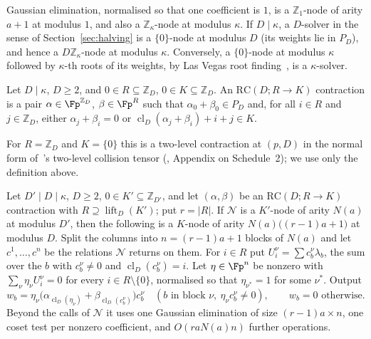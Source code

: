 Gaussian elimination, normalised so that one coefficient is $1$, is a $\mathbb{Z}_1$-node of arity $a+1$ at modulus $1$, and also a $\mathbb{Z}_\kappa$-node at modulus $\kappa$. If $D \mid \kappa$, a $D$-solver in the sense of Section~\ref{sec:halving} is a $\{0\}$-node at modulus $D$ (its weights lie in $P_D$), and hence a $D\mathbb{Z}_\kappa$-node at modulus $\kappa$. Conversely, a $\{0\}$-node at modulus $\kappa$ followed by $\kappa$-th roots of its weights, by Las Vegas root finding~\cite{Rabin1980}, is a $\kappa$-solver.

\begin{definition}
\label{def:rc}
Let $D \mid \kappa$, $D \ge 2$, and $0 \in R \subseteq \mathbb{Z}_D$, $0 \in K \subseteq \mathbb{Z}_D$. An $\mathrm{RC}(D;R\to K)$ contraction is a pair $\alpha \in \Fp^{\mathbb{Z}_D}$, $\beta \in \Fp^R$ such that $\alpha_0+\beta_0 \in P_D$ and, for all $i \in R$ and $j \in \mathbb{Z}_D$, either $\alpha_j+\beta_i = 0$ or $\operatorname{cl}_D(\alpha_j+\beta_i) + i + j \in K$.
\end{definition}

For $R = \mathbb{Z}_D$ and $K = \{0\}$ this is a two-level contraction at $(p,D)$ in the normal form of~\cite{IvanyosSantha2015}'s two-level collision tensor (\fullv, Appendix on Schedule~2); we use only the definition above.

\begin{lemma}
\label{lem:refine}
Let $D' \mid D \mid \kappa$, $D \ge 2$, $0 \in K' \subseteq \mathbb{Z}_{D'}$, and let $(\alpha,\beta)$ be an $\mathrm{RC}(D;R\to K)$ contraction with $R \supseteq \operatorname{lift}_D(K')$; put $r = |R|$. If $\mathcal N$ is a $K'$-node of arity $N(a)$ at modulus $D'$, then the following is a $K$-node of arity $N(a)\bigl((r-1)a+1\bigr)$ at modulus $D$. Split the columns into $n = (r-1)a+1$ blocks of $N(a)$ and let $c^1,\dots,c^n$ be the relations $\mathcal N$ returns on them. For $i \in R$ put $U^\nu_i = \sum c^\nu_b\lambda_b$, the sum over the $b$ with $c^\nu_b \ne 0$ and $\operatorname{cl}_D(c^\nu_b) = i$. Let $\eta \in \Fp^n$ be nonzero with $\sum_\nu\eta_\nu U^\nu_i = 0$ for every $i \in R\setminus\{0\}$, normalised so that $\eta_{\nu^\ast} = 1$ for some $\nu^\ast$. Output
\[
  w_b = \eta_\nu\bigl(\alpha_{\operatorname{cl}_D(\eta_\nu)} + \beta_{\operatorname{cl}_D(c^\nu_b)}\bigr)c^\nu_b \quad (b \text{ in block } \nu,\ \eta_\nu c^\nu_b \ne 0), \qquad w_b = 0 \text{ otherwise}.
\]
Beyond the calls of $\mathcal N$ it uses one Gaussian elimination of size $(r-1)a \times n$, one coset test per nonzero coefficient, and $O(raN(a)n)$ further operations.
\end{lemma}

